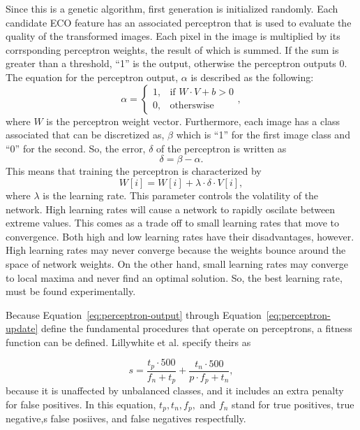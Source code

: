 \documentclass[conference]{IEEEtran}
\begin{document}
Since this is a genetic algorithm, first generation is initialized randomly. Each candidate ECO feature has an associated perceptron that is used to evaluate the quality of the transformed images. Each pixel in the image is multiplied by its corrsponding perceptron weights, the result of which is summed. If the sum is greater than a threshold, ``1'' is the output, otherwise the perceptron outputs 0. The equation for the perceptron output, $\alpha$ is described as the following:
\begin{equation}
  \alpha =
  \begin{cases}
    1, & \text{if } W \cdot V + b > 0\\
    0, & \text{otherswise}
    \end{cases},
  \label{eq:perceptron-output}
\end{equation}
where $W$ is the perceptron weight vector. Furthermore, each image has a class associated that can be discretized as, $\beta$ which is ``1'' for the first image class and ``0'' for the second. So, the error, $\delta$ of the perceptron is written as
\begin{equation}
  \delta = \beta - \alpha.
  \label{eq:perceptron-error}
\end{equation}
This means that training the perceptron is characterized by
\begin{equation}
  W[i] = W[i] + \lambda \cdot \delta \cdot V[i],
  \label{eq:perceptron-update}
\end{equation}
where $\lambda$ is the learning rate. This parameter controls the volatility of the network. High learning rates will cause a network to rapidly oscilate between extreme values. This comes as a trade off to small learning rates that move to convergence. Both high and low learning rates have their disadvantages, however. High learning rates may never converge because the weights bounce around the space of network weights. On the other hand, small learning rates may converge to local maxima and never find an optimal solution. So, the best learning rate, must be found experimentally.

Because Equation~\ref{eq:perceptron-output} through Equation~\ref{eq:perceptron-update} define the fundamental procedures that operate on perceptrons, a fitness function can be defined. Lillywhite et al. specify theirs as

\begin{equation}
  s = \frac{t_p \cdot 500}{f_n + t_p} + \frac{t_n \cdot 500}{p \cdot f_p+ t_n},
  \label{eq:fitness-lilly}
\end{equation}
because it is unaffected by unbalanced classes, and it includes an extra penalty for false positives. In this equation, $t_p, t_n, f_p,$ and $f_n$ stand for true positives, true negative,s false posiives, and false negatives respectfully.
\end{document}
